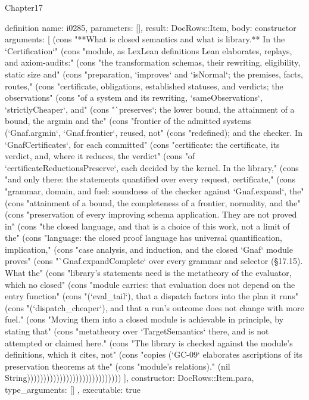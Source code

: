 \begin{lexlean}{Chapter17}
\begin{semanticmodule}
definition{
  name: i0285,
  parameters: [],
  result: DocRows::Item,
  body: constructor{
    arguments: [
      (cons "**What is closed semantics and what is library.** In the `Certification`" (cons "module, as LexLean definitions Lean elaborates, replays, and axiom-audits:" (cons "the transformation schemas, their rewriting, eligibility, static size and" (cons "preparation, `improves` and `isNormal`; the premises, facts, routes," (cons "certificate, obligations, established statuses, and verdicts; the observations" (cons "of a system and its rewriting, `sameObservations`, `strictlyCheaper`, and" (cons "`preserves`; the lower bound, the attainment of a bound, the argmin and the" (cons "frontier of the admitted systems (`Gnaf.argmin`, `Gnaf.frontier`, reused, not" (cons "redefined); and the checker. In `GnafCertificates`, for each committed" (cons "certificate: the certificate, its verdict, and, where it reduces, the verdict" (cons "of `certificateReductionsPreserve`, each decided by the kernel. In the library," (cons "and only there: the statements quantified over every request, certificate," (cons "grammar, domain, and fuel: soundness of the checker against `Gnaf.expand`, the" (cons "attainment of a bound, the completeness of a frontier, normality, and the" (cons "preservation of every improving schema application. They are not proved in" (cons "the closed language, and that is a choice of this work, not a limit of the" (cons "language: the closed proof language has universal quantification, implication," (cons "case analysis, and induction, and the closed `Gnaf` module proves" (cons "`Gnaf.expandComplete` over every grammar and selector (§17.15). What the" (cons "library's statements need is the metatheory of the evaluator, which no closed" (cons "module carries: that evaluation does not depend on the entry function" (cons "(`eval_tail`), that a dispatch factors into the plan it runs" (cons "(`dispatch_cheaper`), and that a run's outcome does not change with more fuel." (cons "Moving them into a closed module is achievable in principle, by stating that" (cons "metatheory over `TargetSemantics` there, and is not attempted or claimed here." (cons "The library is checked against the module's definitions, which it cites, not" (cons "copies (`GC-09` elaborates ascriptions of its preservation theorems at the" (cons "module's relations)." (nil String)))))))))))))))))))))))))))))
    ],
    constructor: DocRows::Item.para,
    type_arguments: []
  },
  executable: true
}


\end{semanticmodule}
\end{lexlean}
